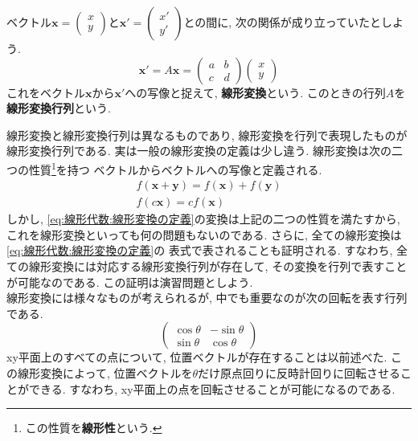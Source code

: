         ベクトル$\bm{x}=\begin{pmatrix}x\\y\end{pmatrix}$と$\bm{x}'=\begin{pmatrix}x'\\y'\end{pmatrix}$との間に, 次の関係が成り立っていたとしよう.
        \begin{equation}
            \bm{x}'=A\bm{x}=\begin{pmatrix}a & b \\ c& d\end{pmatrix}\begin{pmatrix}x\\y\end{pmatrix} \label{eq:線形代数:線形変換の定義}
        \end{equation}
        これをベクトル$\bm{x}$から$\bm{x}'$への写像と捉えて, \textbf{線形変換}という. このときの行列$A$を\textbf{線形変換行列}という.

        線形変換と線形変換行列は異なるものであり, 線形変換を行列で表現したものが線形変換行列である. 実は一般の線形変換の定義は少し違う. 線形変換は次の二つの性質\footnote{この性質を\textbf{線形性}という.}を持つ
        ベクトルからベクトルへの写像と定義される.
        \begin{align}
            f(\bm{x}+\bm{y})=f(\bm{x})+f(\bm{y}) \label{eq:線形代数:線形変換の条件1}\\
            f(c\bm{x})=cf(\bm{x}) \label{eq:線形代数:線形変換の条件2}
        \end{align}
        しかし, \eqref{eq:線形代数:線形変換の定義}の変換は上記の二つの性質を満たすから, これを線形変換といっても何の問題もないのである. さらに, 全ての線形変換は\eqref{eq:線形代数:線形変換の定義}の
        表式で表されることも証明される. すなわち, 全ての線形変換には対応する線形変換行列が存在して, その変換を行列で表すことが可能なのである. この証明は演習問題としよう.\\

        線形変換には様々なものが考えられるが, 中でも重要なのが次の回転を表す行列である.
        \begin{equation}
            \begin{pmatrix}
                \cos\theta & -\sin\theta \\
                \sin\theta & \cos\theta
            \end{pmatrix}\label{eq:線形代数:回転行列}
        \end{equation}
        xy平面上のすべての点について, 位置ベクトルが存在することは以前述べた. この線形変換によって, 位置ベクトルを$\theta$だけ原点回りに反時計回りに回転させることができる.
        すなわち, xy平面上の点を回転させることが可能になるのである. 

